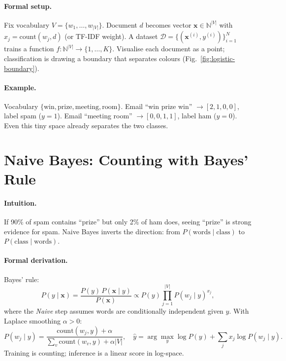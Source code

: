 \paragraph{Formal setup.} Fix vocabulary $V=\{w_1,\dots,w_{|V|}\}$. Document $d$ becomes vector $\mathbf{x}\in\mathbb{N}^{|V|}$ with $x_j=\text{count}(w_j,d)$ (or TF-IDF weight). A dataset $\mathcal{D}=\{(\mathbf{x}^{(i)},y^{(i)})\}_{i=1}^N$ trains a function $f:\mathbb{N}^{|V|}\to\{1,\dots,K\}$. Visualise each document as a point; classification is drawing a boundary that separates colours (Fig.~\ref{fig:logistic-boundary}).

\paragraph{Example.} Vocabulary $\{\text{win},\text{prize},\text{meeting},\text{room}\}$. Email ``win prize win'' $\to [2,1,0,0]$, label spam ($y=1$). Email ``meeting room'' $\to [0,0,1,1]$, label ham ($y=0$). Even this tiny space already separates the two classes.

\section{Naive Bayes: Counting with Bayes' Rule}
\label{sec:naive-bayes}
\paragraph{Intuition.} If 90\% of spam contains ``prize'' but only 2\% of ham does, seeing ``prize'' is strong evidence for spam. Naive Bayes inverts the direction: from $P(\text{words}\mid\text{class})$ to $P(\text{class}\mid\text{words})$.

\paragraph{Formal derivation.} Bayes' rule:
\begin{equation}
P(y\mid\mathbf{x})=\frac{P(y)\,P(\mathbf{x}\mid y)}{P(\mathbf{x})}\propto P(y)\prod_{j=1}^{|V|}P(w_j\mid y)^{x_j},
\label{eq:nb}
\end{equation}
where the \emph{Naive} step assumes words are conditionally independent given $y$. With Laplace smoothing $\alpha>0$:
\begin{equation}
P(w_j\mid y)=\frac{\text{count}(w_j,y)+\alpha}{\sum_{v}\text{count}(w_v,y)+\alpha|V|},\quad
\hat{y}=\arg\max_y \log P(y)+\sum_j x_j\log P(w_j\mid y).
\end{equation}
Training is counting; inference is a linear score in log-space.

